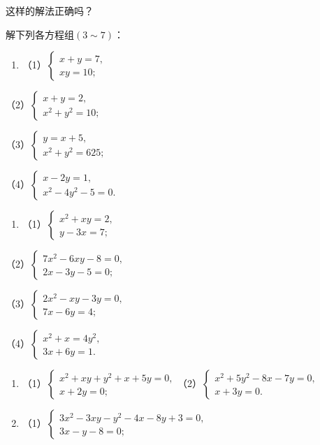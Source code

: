 这样的解法正确吗？

解下列各方程组\((3\sim7)\)：

\begin{enumerate}[start=3]
\item
  （1）\(\left\{ \begin{array}{l} x + y = 7, \\ xy = 10; \end{array} \right.\)
\end{enumerate}

（2）\(\left\{ \begin{array}{l} x + y = 2, \\ x^2 + y^2 = 10; \end{array} \right.\)

（3）\(\left\{ \begin{array}{l} y = x + 5, \\ x^2 + y^2 = 625; \end{array} \right.\)

（4）\(\left\{ \begin{array}{l} x - 2y = 1, \\ x^2 - 4y^2 - 5 = 0. \end{array} \right.\)

\begin{enumerate}[start=4]
\item
  （1）\(\left\{ \begin{array}{l} x^{2} + xy = 2, \\ y - 3x = 7; \end{array} \right.\)
\end{enumerate}

（2）\(\left\{ \begin{array}{l} 7x^{2} - 6xy - 8 = 0, \\ 2x - 3y - 5 = 0; \end{array} \right.\)

（3）\(\left\{ \begin{array}{l} 2x^{2} - xy - 3y = 0, \\ 7x - 6y = 4; \end{array} \right.\)

（4）\(\left\{ \begin{array}{l} x^{2} + x = 4y^{2}, \\ 3x + 6y = 1. \end{array} \right.\)

\begin{enumerate}[start=5]
\item
  （1）\(\left\{ \begin{array}{l} x^{2} + xy + y^{2} + x + 5y = 0, \\ x + 2y = 0; \end{array} \right.\)（2）\(\left\{ \begin{array}{l} x^{2} + 5y^{2} - 8x - 7y = 0, \\ x + 3y = 0. \end{array} \right.\)
\item
  （1）\(\left\{ \begin{array}{l} 3x^{2} - 3xy - y^{2} - 4x - 8y + 3 = 0, \\ 3x - y - 8 = 0; \end{array} \right.\)
\end{enumerate}


